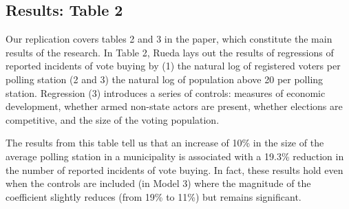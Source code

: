 \documentclass[12pt]{article}
\begin{document}
\subsection{Results: Table 2}

Our replication covers tables 2 and 3 in the paper, which constitute the main results of the research.  
In Table 2, Rueda lays out the results of regressions of reported incidents of vote buying by  (1) the natural log of registered voters per polling station (2 and 3) the natural log of population above 20 per polling station. Regression (3) introduces a series of controls: measures of economic development, whether armed non-state actors are present, whether elections are competitive, and the size of the voting population. 


\FloatBarrier
\begin{table}[]
    \caption*{Simple Replication of Table 2}
    \centering
{}
\end{table}

The results from this table tell us that an increase of 10\% in the size of the average polling station in a municipality is associated with a 19.3\% reduction in the number of reported incidents of vote buying. In fact, these results hold even when the controls are included (in Model 3) where the magnitude of the coefficient slightly reduces (from 19\% to 11\%) but remains significant. 
\end{document}
